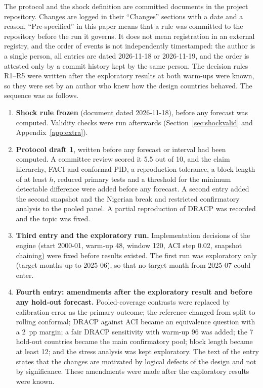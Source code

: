 The protocol and the shock definition are committed documents in the project repository. Changes are logged in their ``Changes'' sections with a date and a reason. ``Pre-specified'' in this paper means that a rule was committed to the repository before the run it governs. It does not mean registration in an external registry, and the order of events is not independently timestamped: the author is a single person, all entries are dated 2026-11-18 or 2026-11-19, and the order is attested only by a commit history kept by the same person. The decision rules R1--R5 were written after the exploratory results at both warm-ups were known, so they were set by an author who knew how the design countries behaved. The sequence was as follows.
\begin{enumerate}
\item \textbf{Shock rule frozen} (document dated 2026-11-18), before any forecast was computed. Validity checks were run afterwards (Section~\ref{sec:shockvalid} and Appendix~\ref{app:extra}).
\item \textbf{Protocol draft 1}, written before any forecast or interval had been computed. A committee review scored it 5.5 out of 10, and the claim hierarchy, FACI and conformal PID, a reproduction tolerance, a block length of at least $h$, reduced primary tests and a threshold for the minimum detectable difference were added before any forecast. A second entry added the second snapshot and the Nigerian break and restricted confirmatory analysis to the pooled panel. A partial reproduction of DRACP was recorded and the topic was fixed.
\item \textbf{Third entry and the exploratory run.} Implementation decisions of the engine (start 2000-01, warm-up 48, window 120, ACI step 0.02, snapshot chaining) were fixed before results existed. The first run was exploratory only (target months up to 2025-06), so that no target month from 2025-07 could enter.
\item \textbf{Fourth entry: amendments after the exploratory result and before any hold-out forecast.} Pooled-coverage contrasts were replaced by calibration error as the primary outcome; the reference changed from split to rolling conformal; DRACP against ACI became an equivalence question with a 2~pp margin; a fair DRACP sensitivity with warm-up 96 was added; the 7 hold-out countries became the main confirmatory pool; block length became at least 12; and the stress analysis was kept exploratory. The text of the entry states that the changes are motivated by logical defects of the design and not by significance. These amendments were made after the exploratory results were known.

\end{enumerate}
